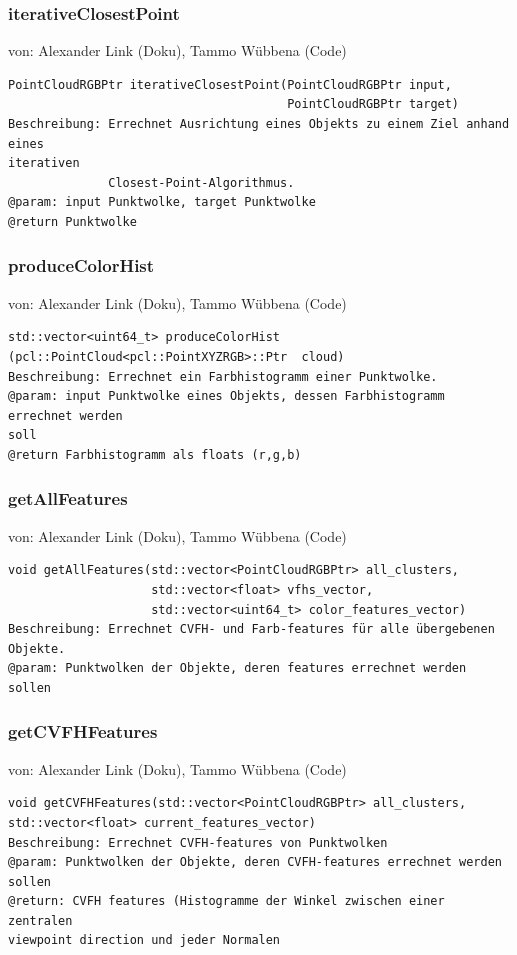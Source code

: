 \documentclass{suturo}
\makeatletter
\newcommand{\chapterauthor}[1]{%
  {\parindent0pt\vspace*{-27pt}%
  \linespread{0}\small\begin{flushright}von: #1\end{flushright}%
  \par\nobreak\vspace*{0pt}}
  \@afterheading%
}
\makeatother
\begin{document}
\subsubsection{iterativeClosestPoint}
\chapterauthor{Alexander Link (Doku), Tammo Wübbena (Code)}
\begin{verbatim}
PointCloudRGBPtr iterativeClosestPoint(PointCloudRGBPtr input,
                                       PointCloudRGBPtr target)
Beschreibung: Errechnet Ausrichtung eines Objekts zu einem Ziel anhand eines
iterativen 
			  Closest-Point-Algorithmus.
@param: input Punktwolke, target Punktwolke
@return Punktwolke
\end{verbatim}\label{func:iterativeClosestPoint}

\subsubsection{produceColorHist}
\chapterauthor{Alexander Link (Doku), Tammo Wübbena (Code)}
\begin{verbatim}
std::vector<uint64_t> produceColorHist
(pcl::PointCloud<pcl::PointXYZRGB>::Ptr  cloud)
Beschreibung: Errechnet ein Farbhistogramm einer Punktwolke.
@param: input Punktwolke eines Objekts, dessen Farbhistogramm errechnet werden
soll
@return Farbhistogramm als floats (r,g,b)
\end{verbatim}\label{func:produceColorHist}

\subsubsection{getAllFeatures}
\chapterauthor{Alexander Link (Doku), Tammo Wübbena (Code)}
\begin{verbatim}
void getAllFeatures(std::vector<PointCloudRGBPtr> all_clusters,
                    std::vector<float> vfhs_vector,
                    std::vector<uint64_t> color_features_vector)
Beschreibung: Errechnet CVFH- und Farb-features für alle übergebenen Objekte.
@param: Punktwolken der Objekte, deren features errechnet werden sollen
\end{verbatim}\label{func:getallfeatures}

\subsubsection{getCVFHFeatures}
\chapterauthor{Alexander Link (Doku), Tammo Wübbena (Code)}
\begin{verbatim}
void getCVFHFeatures(std::vector<PointCloudRGBPtr> all_clusters,
std::vector<float> current_features_vector)
Beschreibung: Errechnet CVFH-features von Punktwolken
@param: Punktwolken der Objekte, deren CVFH-features errechnet werden sollen
@return: CVFH features (Histogramme der Winkel zwischen einer zentralen
viewpoint direction und jeder Normalen
\end{verbatim}\label{func:getcvfhfeatures}
\end{document}
